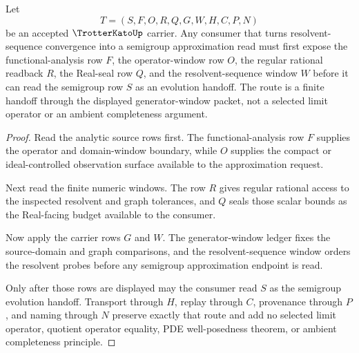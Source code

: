 \begin{theorem}
\label{thm:trotter-kato-resolvent-sequence-handoff}
Let
$$
T=(S,F,O,R,Q,G,W,H,C,P,N)
$$
be an accepted $\TrotterKatoUp$ carrier. Any consumer that turns resolvent-sequence convergence into a semigroup approximation read must first expose the functional-analysis row $F$, the operator-window row $O$, the regular rational readback $R$, the Real-seal row $Q$, and the resolvent-sequence window $W$ before it can read the semigroup row $S$ as an evolution handoff. The route is a finite handoff through the displayed generator-window packet, not a selected limit operator or an ambient completeness argument.
\end{theorem}
\begin{proof}
Read the analytic source rows first. The functional-analysis row $F$ supplies the operator and domain-window boundary, while $O$ supplies the compact or ideal-controlled observation surface available to the approximation request.

Next read the finite numeric windows. The row $R$ gives regular rational access to the inspected resolvent and graph tolerances, and $Q$ seals those scalar bounds as the Real-facing budget available to the consumer.

Now apply the carrier rows $G$ and $W$. The generator-window ledger fixes the source-domain and graph comparisons, and the resolvent-sequence window orders the resolvent probes before any semigroup approximation endpoint is read.

Only after those rows are displayed may the consumer read $S$ as the semigroup evolution handoff. Transport through $H$, replay through $C$, provenance through $P$, and naming through $N$ preserve exactly that route and add no selected limit operator, quotient operator equality, PDE well-posedness theorem, or ambient completeness principle.
\end{proof}



